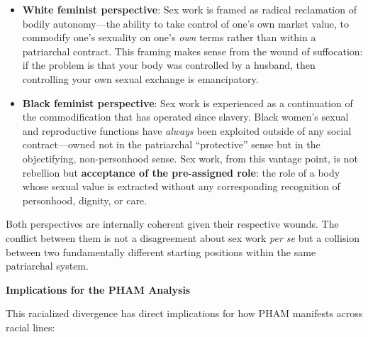 \documentclass[12pt, letterpaper]{article}
\begin{document}
\begin{itemize}
    \item \textbf{White feminist perspective}: Sex work is framed as radical reclamation of bodily autonomy---the ability to take control of one's own market value, to commodify one's sexuality on one's \textit{own} terms rather than within a patriarchal contract. This framing makes sense from the wound of suffocation: if the problem is that your body was controlled by a husband, then controlling your own sexual exchange is emancipatory.
    
    \item \textbf{Black feminist perspective}: Sex work is experienced as a continuation of the commodification that has operated since slavery. Black women's sexual and reproductive functions have \textit{always} been exploited outside of any social contract---owned not in the patriarchal ``protective'' sense but in the objectifying, non-personhood sense. Sex work, from this vantage point, is not rebellion but \textbf{acceptance of the pre-assigned role}: the role of a body whose sexual value is extracted without any corresponding recognition of personhood, dignity, or care.
\end{itemize}

Both perspectives are internally coherent given their respective wounds. The conflict between them is not a disagreement about sex work \textit{per se} but a collision between two fundamentally different starting positions within the same patriarchal system.

\textbf{Implications for the PHAM Analysis}

This racialized divergence has direct implications for how PHAM manifests across racial lines:
\end{document}
